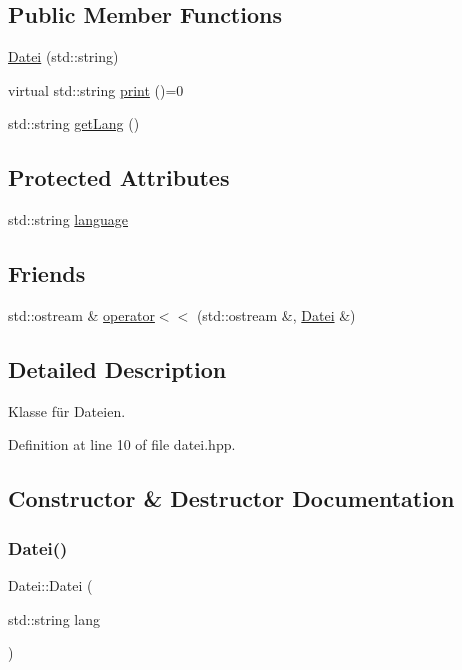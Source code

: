 \subsection*{Public Member Functions}
\begin{DoxyCompactItemize}
\item 
\mbox{\hyperlink{class_datei_a9a9e1149154603548fdfc889821cf418}{Datei}} (std\+::string)
\item 
virtual std\+::string \mbox{\hyperlink{class_datei_a5dedc9776ebe637f0842300f648d4b17}{print}} ()=0
\item 
std\+::string \mbox{\hyperlink{class_datei_aeeaf8e269f4d2b53e209ad905b5b75c5}{get\+Lang}} ()
\end{DoxyCompactItemize}
\subsection*{Protected Attributes}
\begin{DoxyCompactItemize}
\item 
std\+::string \mbox{\hyperlink{class_datei_a49b90e65e1e9523b2a61e370727d9510}{language}}
\end{DoxyCompactItemize}
\subsection*{Friends}
\begin{DoxyCompactItemize}
\item 
std\+::ostream \& \mbox{\hyperlink{class_datei_aca7b8a47eeafb9d0860bebec55d21923}{operator$<$$<$}} (std\+::ostream \&, \mbox{\hyperlink{class_datei}{Datei}} \&)
\end{DoxyCompactItemize}


\subsection{Detailed Description}
Klasse für Dateien. 

Definition at line 10 of file datei.\+hpp.



\subsection{Constructor \& Destructor Documentation}
\mbox{\label{class_datei_a9a9e1149154603548fdfc889821cf418}} 
\subsubsection{\texorpdfstring{Datei()}{Datei()}}
{\footnotesize\ttfamily Datei\+::\+Datei (\begin{DoxyParamCaption}\item[{std\+::string}]{lang }\end{DoxyParamCaption})}

